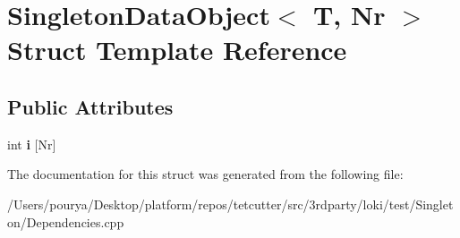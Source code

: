 \hypertarget{structSingletonDataObject}{}\section{Singleton\+Data\+Object$<$ T, Nr $>$ Struct Template Reference}
\label{structSingletonDataObject}
\subsection*{Public Attributes}
\begin{DoxyCompactItemize}
\item 
\hypertarget{structSingletonDataObject_a9eb6ae9d297b08b04c3a7e6901d7674f}{}int {\bfseries i} \mbox{[}Nr\mbox{]}\label{structSingletonDataObject_a9eb6ae9d297b08b04c3a7e6901d7674f}

\end{DoxyCompactItemize}


The documentation for this struct was generated from the following file\+:\begin{DoxyCompactItemize}
\item 
/\+Users/pourya/\+Desktop/platform/repos/tetcutter/src/3rdparty/loki/test/\+Singleton/Dependencies.\+cpp\end{DoxyCompactItemize}
